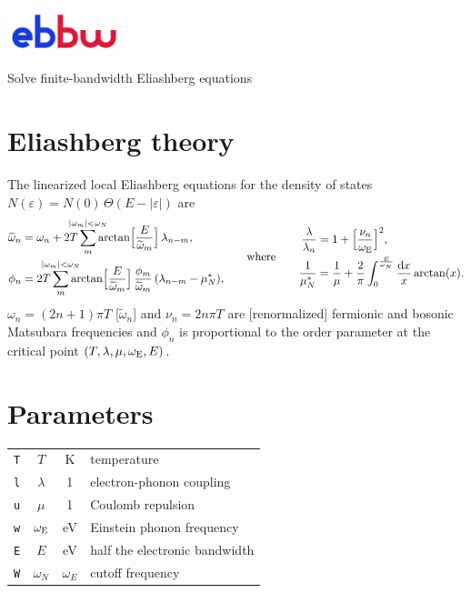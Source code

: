 \documentclass[a4paper]{article}
\def\D{\mathrm d}
\def\sub#1{\sb{\mathrm{#1}}}
\def\limit#1{\sp{\mathclap{#1}}}
\let\tilde\widetilde
\let\epsilon\varepsilon
\let\Theta\varTheta
\def\headline#1{\section*{\normalsize\normalfont%
   \rlap{\rule[0.5ex]{\textwidth}{0.4pt}}\qquad\colorbox{white}{#1}}}
\begin{document}
   \begin{center}
      \includegraphics[width=33mm]{../logo/ebbw} \par \bigskip
      \large Solve finite-bandwidth Eliashberg equations
   \end{center}

   \headline{Eliashberg theory}

   The linearized local Eliashberg equations for the density of states
   $N(\epsilon) = N(0) \, \Theta(E - |\epsilon|)$ are
   \begin{align*}
      \begin{aligned}
         \tilde \omega_n &= \omega_n + 2 T \sum_m \limit{|\omega_m| < \omega_N}
         \arctan \Bigl[ \frac E {\tilde \omega_m} \Bigr] \, \lambda_{n - m},
         \\
         \phi_n &= 2 T \sum_m \limit{|\omega_m| < \omega_N}
         \arctan \Bigl[ \frac E {\tilde \omega_m} \Bigr] \,
         \frac{\phi_m}{\tilde \omega_m} \, (\lambda_{n - m} - \mu^*_N),
      \end{aligned}
      \qquad \text{where} \qquad
      \begin{aligned}
         \frac \lambda {\lambda_n} &=
         1 + \Bigl[ \frac{\nu_n}{\omega \sub E} \Bigr]^2,
         \\
         \frac 1 {\mu^*_N} &=
         \frac 1 \mu + \frac 2 \pi \int_0^{\frac E {\omega_N}} \frac {\D x} x
         \arctan(x).
      \end{aligned}
   \end{align*}
   $\omega_n = (2 n + 1) \pi T$ [$\tilde \omega_n$] and $\nu_n = 2 n \pi T$ are
   [renormalized] fermionic and bosonic Matsubara frequencies and $\phi_n$ is
   proportional to the order parameter at the critical point $(T, \lambda, \mu,
   \omega \sub E, E)$.

   \headline{Parameters}

   \begin{center}
      \begin{tabular}{r c c l}
         \verb|T| & $T$ & K & temperature \\
         \verb|l| & $\lambda$ & 1 & electron-phonon coupling \\
         \verb|u| & $\mu$ & 1 & Coulomb repulsion \\
         \verb|w| & $\omega \sub E$ & eV & Einstein phonon frequency \\
         \verb|E| & $E$ & eV & half the electronic bandwidth \\
         \verb|W| & $\omega_N$ & $\omega_E$ & cutoff frequency
      \end{tabular}
   \end{center}
\end{document}
